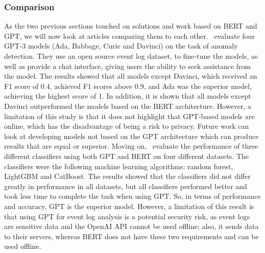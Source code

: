 \subsubsection{Comparison}
As the two previous sections touched on solutions and work based on BERT and GPT, we will now look at articles comparing them to each other.~\cite{balasubramanian2023transformer} evaluate four GPT-3 models (Ada, Babbage, Curie and Davinci) on the task of anomaly detection. They use an open source event log dataset, to fine-tune the models, as well as provide a chat interface, giving users the ability to seek assistance from the model. The results showed that all models except Davinci, which received an F1 score of 0.4, achieved F1 scores above 0.9, and Ada was the superior model, achieving the highest score of 1. In addition, it is shown that all models except Davinci outperformed the models based on the BERT architecture. However, a limitation of this study is that it does not highlight that GPT-based models are online, which has the disadvantage of being a risk to privacy. Future work can look at developing models not based on the GPT architecture which can produce results that are equal or superior. Moving on,~\cite{mannam2023optimizing} evaluate the performance of three different classifiers using both GPT and BERT on four different datasets. The classifiers were the following machine learning algorithms: random forest, LightGBM and CatBoost. The results showed that the classifiers did not differ greatly in performance in all datasets, but all classifiers performed better and took less time to complete the task when using GPT. So, in terms of performance and accuracy, GPT is the superior model. However, a limitation of this result is that using GPT for event log analysis is a potential security risk, as event logs are sensitive data and the OpenAI API cannot be used offline; also, it sends data to their servers, whereas BERT does not have these two requirements and can be used offline. 


